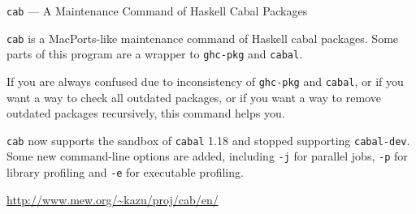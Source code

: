 \begin{hcarentry}[updated]{{\tt cab} --- A Maintenance Command of Haskell Cabal Packages}
\makeheader

{\tt cab} is a MacPorts-like maintenance command of Haskell cabal packages. Some parts of this program are a wrapper to {\tt ghc-pkg} and {\tt cabal}.

If you are always confused due to inconsistency of {\tt ghc-pkg} and {\tt cabal}, or if you want a way to check all outdated packages, or if you want a way to remove outdated packages recursively, this command helps you.

{\tt cab} now supports the sandbox of {\tt cabal} 1.18 and stopped supporting {\tt cabal-dev}. Some new command-line options are added, including {\tt -j} for parallel jobs, {\tt -p} for library profiling and {\tt -e} for executable profiling.

\FurtherReading
  \url{http://www.mew.org/~kazu/proj/cab/en/}
\end{hcarentry}
